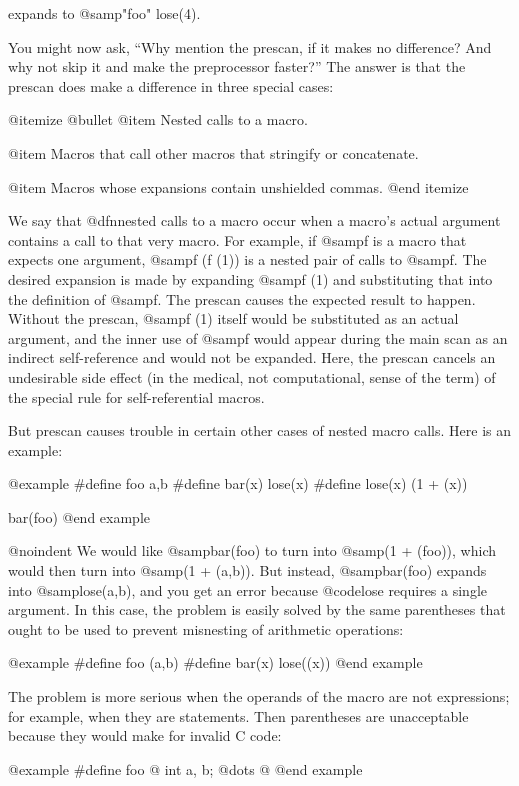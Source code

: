 {{expands to @samp{"foo" lose(4)}.

You might now ask, ``Why mention the prescan, if it makes no difference?
And why not skip it and make the preprocessor faster?''  The answer is
that the prescan does make a difference in three special cases:

@itemize @bullet
@item
Nested calls to a macro.

@item
Macros that call other macros that stringify or concatenate.

@item
Macros whose expansions contain unshielded commas.
@end itemize

We say that @dfn{nested} calls to a macro occur when a macro's actual
argument contains a call to that very macro.  For example, if @samp{f}
is a macro that expects one argument, @samp{f (f (1))} is a nested
pair of calls to @samp{f}.  The desired expansion is made by
expanding @samp{f (1)} and substituting that into the definition of
@samp{f}.  The prescan causes the expected result to happen.
Without the prescan, @samp{f (1)} itself would be substituted as
an actual argument, and the inner use of @samp{f} would appear
during the main scan as an indirect self-reference and would not
be expanded.  Here, the prescan cancels an undesirable side effect
(in the medical, not computational, sense of the term) of the special
rule for self-referential macros.

But prescan causes trouble in certain other cases of nested macro calls.
Here is an example:

@example
#define foo  a,b
#define bar(x) lose(x)
#define lose(x) (1 + (x))

bar(foo)
@end example

@noindent
We would like @samp{bar(foo)} to turn into @samp{(1 + (foo))}, which
would then turn into @samp{(1 + (a,b))}.  But instead, @samp{bar(foo)}
expands into @samp{lose(a,b)}, and you get an error because @code{lose}
requires a single argument.  In this case, the problem is easily solved
by the same parentheses that ought to be used to prevent misnesting of
arithmetic operations:

@example
#define foo (a,b)
#define bar(x) lose((x))
@end example

The problem is more serious when the operands of the macro are not
expressions; for example, when they are statements.  Then parentheses
are unacceptable because they would make for invalid C code:

@example
#define foo @{ int a, b; @dots{} @}
@end example

}}
